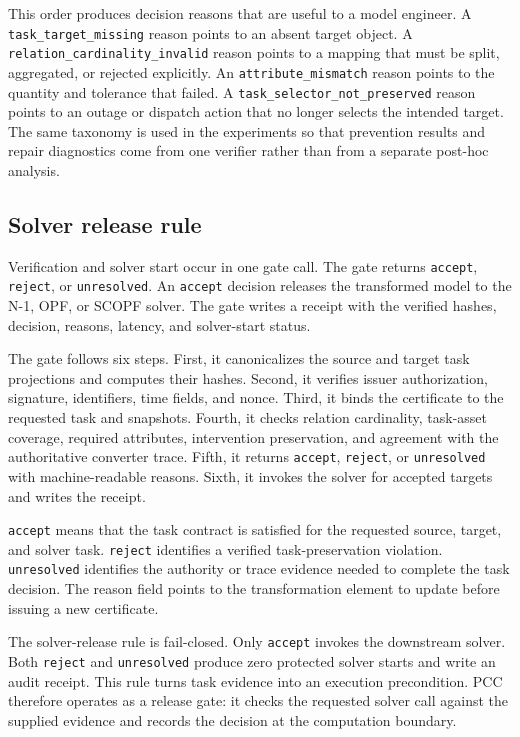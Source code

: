 \documentclass[preprint,12pt]{elsarticle}
\begin{document}
This order produces decision reasons that are useful to a model engineer. A \texttt{task\_target\_missing} reason points to an absent target object. A \texttt{relation\_cardinality\_invalid} reason points to a mapping that must be split, aggregated, or rejected explicitly. An \texttt{attribute\_mismatch} reason points to the quantity and tolerance that failed. A \texttt{task\_selector\_not\_preserved} reason points to an outage or dispatch action that no longer selects the intended target. The same taxonomy is used in the experiments so that prevention results and repair diagnostics come from one verifier rather than from a separate post-hoc analysis.

\subsection{Solver release rule}

Verification and solver start occur in one gate call. The gate returns \texttt{accept}, \texttt{reject}, or \texttt{unresolved}. An \texttt{accept} decision releases the transformed model to the N-1, OPF, or SCOPF solver. The gate writes a receipt with the verified hashes, decision, reasons, latency, and solver-start status.

The gate follows six steps. First, it canonicalizes the source and target task projections and computes their hashes. Second, it verifies issuer authorization, signature, identifiers, time fields, and nonce. Third, it binds the certificate to the requested task and snapshots. Fourth, it checks relation cardinality, task-asset coverage, required attributes, intervention preservation, and agreement with the authoritative converter trace. Fifth, it returns \texttt{accept}, \texttt{reject}, or \texttt{unresolved} with machine-readable reasons. Sixth, it invokes the solver for accepted targets and writes the receipt.

\texttt{accept} means that the task contract is satisfied for the requested source, target, and solver task. \texttt{reject} identifies a verified task-preservation violation. \texttt{unresolved} identifies the authority or trace evidence needed to complete the task decision. The reason field points to the transformation element to update before issuing a new certificate.

The solver-release rule is fail-closed. Only \texttt{accept} invokes the downstream solver. Both \texttt{reject} and \texttt{unresolved} produce zero protected solver starts and write an audit receipt. This rule turns task evidence into an execution precondition. PCC therefore operates as a release gate: it checks the requested solver call against the supplied evidence and records the decision at the computation boundary.
\end{document}
